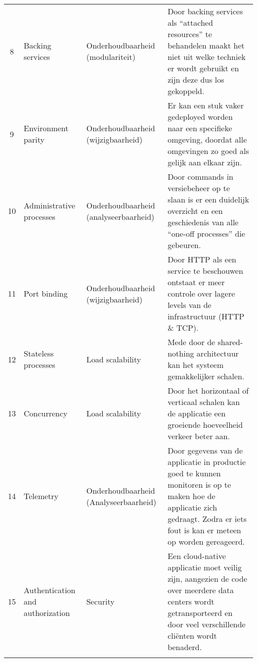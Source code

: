 \begin{longtable}[c]{c p{3cm} p{3.5cm} p{5.5cm}}
	8 & Backing services & Onderhoudbaarheid (modulariteit) & Door backing services als \enquote{attached resources} te behandelen maakt het niet uit welke techniek er wordt gebruikt en zijn deze dus los gekoppeld. \\
	9 & Environment parity & Onderhoudbaarheid (wijzigbaarheid) & Er kan een stuk vaker gedeployed worden naar een specifieke omgeving, doordat alle omgevingen zo goed als gelijk aan elkaar zijn. \\
	10 & Administrative processes & Onderhoudbaarheid (analyseerbaarheid) & Door commands in versiebeheer op te slaan is er een duidelijk overzicht en een geschiedenis van alle \enquote{one-off processes} die gebeuren. \\
	11 & Port binding & Onderhoudbaarheid (wijzigbaarheid) & Door HTTP als een service te beschouwen ontstaat er meer controle over lagere levels van de infrastructuur (HTTP \& TCP). \\
	12 & Stateless processes & Load scalability & Mede door de shared-nothing architectuur kan het systeem gemakkelijker schalen. \\
	13 & Concurrency & Load scalability &  Door het horizontaal of verticaal schalen kan de applicatie een groeiende hoeveelheid verkeer beter aan. \\
	14 & Telemetry & Onderhoudbaarheid (Analyseerbaarheid) & Door gegevens van de applicatie in productie goed te kunnen monitoren is op te maken hoe de applicatie zich gedraagt. Zodra er iets fout is kan er meteen op worden gereageerd. \\
	15 & Authentication and authorization & Security & Een cloud-native applicatie moet veilig zijn, aangezien de code over meerdere data centers wordt getransporteerd en door veel verschillende cliënten wordt benaderd. \\
	\bottomrule\\
\end{longtable}

\label{Bijlagek6}
